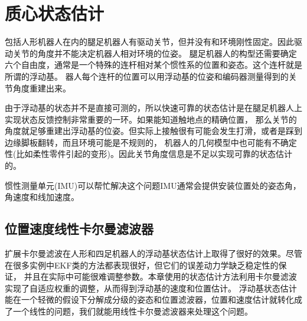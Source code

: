 \section{质心状态估计}
\label{sec:com_est}
包括人形机器人在内的腿足机器人有驱动关节，但并没有和环境刚性固定。因此驱动关节的角度并不能决定机器人相对环境的位姿。
腿足机器人的构型还需要确定六个自由度，通常是一个特殊的连杆相对某个惯性系的位置和姿态。这个连杆就是所谓的浮动基。
器人每个连杆的位置可以用浮动基的位姿和编码器测量得到的关节角度重建出来。

由于浮动基的状态并不是直接可测的，所以快速可靠的状态估计是在腿足机器人上实现状态反馈控制非常重要的一环。如果能知道触地点的精确位置，
那么关节的角度就足够重建出浮动基的位姿。但实际上接触很有可能会发生打滑，或者是踩到边缘脚板翻转，而且环境可能是不规则的，
机器人的几何模型中也可能有不确定性(比如柔性零件引起的变形)。因此关节角度信息是不足以实现可靠的状态估计的。

惯性测量单元(IMU)可以帮忙解决这个问题IMU通常会提供安装位置处的姿态角，角速度和线加速度。



\subsection{位置速度线性卡尔曼滤波器}
扩展卡尔曼滤波在人形和四足机器人的浮动基状态估计上取得了很好的效果。尽管在很多实例中EKF类的方法都表现很好，但它们的误差动力学缺乏稳定性的保证，
并且在实际中可能很难调整参数。本章使用的状态估计方法利用卡尔曼滤波实现了自适应权重的调整，从而得到浮动基的速度和位置估计。
浮动基状态估计能在一个轻微的假设下分解成分级的姿态和位置滤波器，位置和速度估计就转化成了一个线性的问题，我们就能用线性卡尔曼滤波器来处理这个问题。

